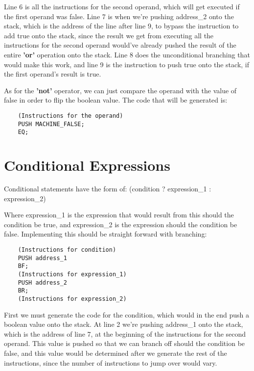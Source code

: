 \documentclass{article}
\begin{document}
Line 6 is all the instructions for the second operand, which will get executed if the first operand was false. Line 7 is when we're pushing address\_2 onto the stack, which is the address of the line after line 9, to bypass the instruction to add true onto the stack, since the result we get from executing all the instructions for the second operand would've already pushed the result of the entire \textbf{'or'} operation onto the stack. Line 8 does the unconditional branching that would make this work, and line 9 is the instruction to push true onto the stack, if the first operand's result is true.

As for the \textbf{'not'} operator, we can just compare the operand with the value of false in order to flip the boolean value. The code that will be generated is:

\begin{lstlisting}
    (Instructions for the operand)
    PUSH MACHINE_FALSE;
    EQ;
\end{lstlisting}

\section{Conditional Expressions}

Conditional statements have the form of: (condition ? expression\_1 : expression\_2)

Where expression\_1 is the expression that would result from this should the condition be true, and expression\_2 is the expression should the condition be false. Implementing this should be straight forward with branching:

\begin{lstlisting}
    (Instructions for condition)
    PUSH address_1
    BF;
    (Instructions for expression_1)
    PUSH address_2
    BR;
    (Instructions for expression_2)
\end{lstlisting}

First we must generate the code for the condition, which would in the end push a boolean value onto the stack. At line 2 we're pushing address\_1 onto the stack, which is the address of line 7, at the beginning of the instructions for the second operand. This value is pushed so that we can branch off should the condition be false, and this value would be determined after we generate the rest of the instructions, since the number of instructions to jump over would vary.
\end{document}
